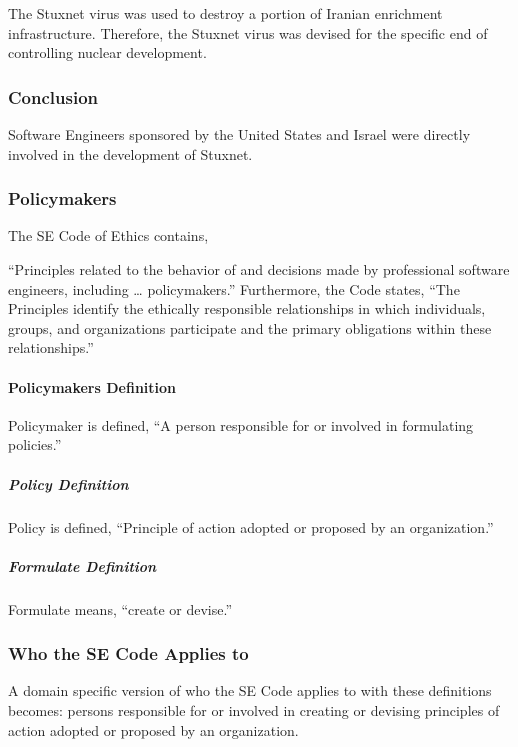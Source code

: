 \documentclass[12pt]{article}
\begin{document}
\begin{multicols}{2}
The Stuxnet virus was used to destroy a portion of Iranian enrichment infrastructure.\cite{theRealStoryOfStuxnet} Therefore, the Stuxnet virus was devised for the specific end of controlling nuclear development.

\subsubsection{Conclusion}
Software Engineers sponsored by the United States and Israel were directly involved in the development of Stuxnet.

\subsubsection{Policymakers}

The SE Code of Ethics contains,

\begin{displayquote}
``Principles related to the behavior of and decisions made by professional software engineers, including … policymakers.'' Furthermore, the Code states, ``The Principles identify the ethically responsible relationships in which individuals, groups, and organizations participate and the primary obligations within these relationships.''\cite{softwareEngineeringCodeOfEthics}
\end{displayquote}

\paragraph{Policymakers Definition}

Policymaker is defined, ``A person responsible for or involved in formulating policies.''\cite{oxfordDictionary}

\subparagraph{Policy Definition}

Policy is defined, ``Principle of action adopted or proposed by an organization.''\cite{oxfordDictionary}

\subparagraph{Formulate Definition}

Formulate means, ``create or devise.''\cite{oxfordDictionary}

\subsubsection{Who the SE Code Applies to}

A domain specific version of who the SE Code applies to with these definitions becomes: persons responsible for or involved in creating or devising principles of action adopted or proposed by an organization.


\end{multicols}
\end{document}
